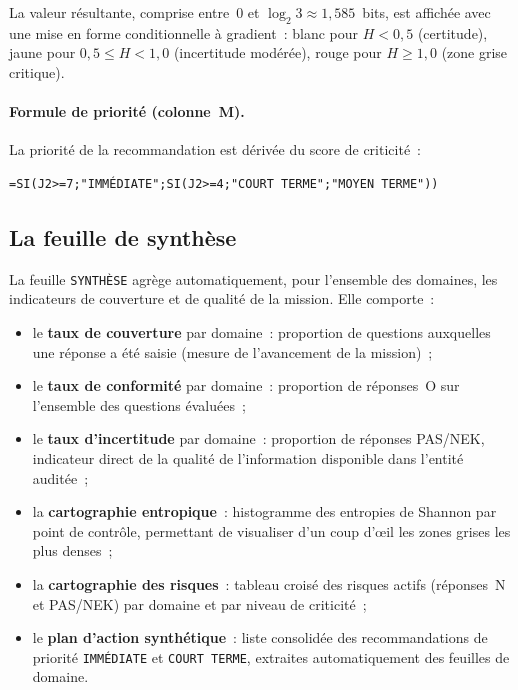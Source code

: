 La valeur résultante, comprise entre~0 et $\log_2 3 \approx 1{,}585$~bits,
est affichée avec une mise en forme conditionnelle à gradient~: blanc pour
$H < 0{,}5$ (certitude), jaune pour $0{,}5 \leq H < 1{,}0$ (incertitude
modérée), rouge pour $H \geq 1{,}0$ (zone grise critique).

\paragraph{Formule de priorité (colonne~M).}
La priorité de la recommandation est dérivée du score de criticité~:

\begin{verbatim}
=SI(J2>=7;"IMMÉDIATE";SI(J2>=4;"COURT TERME";"MOYEN TERME"))
\end{verbatim}

\subsection{La feuille de synthèse}

La feuille \texttt{SYNTHÈSE} agrège automatiquement, pour l'ensemble des
domaines, les indicateurs de couverture et de qualité de la mission. Elle
comporte~:

\begin{itemize}
  \item le \textbf{taux de couverture} par domaine~: proportion de questions
        auxquelles une réponse a été saisie (mesure de l'avancement de la
        mission)~;
  \item le \textbf{taux de conformité} par domaine~: proportion de réponses~O
        sur l'ensemble des questions évaluées~;
  \item le \textbf{taux d'incertitude} par domaine~: proportion de réponses
        PAS/NEK, indicateur direct de la qualité de l'information disponible
        dans l'entité auditée~;
  \item la \textbf{cartographie entropique}~: histogramme des entropies de
        Shannon par point de contrôle, permettant de visualiser d'un coup d'œil
        les zones grises les plus denses~;
  \item la \textbf{cartographie des risques}~: tableau croisé des risques
        actifs (réponses~N et PAS/NEK) par domaine et par niveau de criticité~;
  \item le \textbf{plan d'action synthétique}~: liste consolidée des
        recommandations de priorité \texttt{IMMÉDIATE} et \texttt{COURT TERME},
        extraites automatiquement des feuilles de domaine.
\end{itemize}

